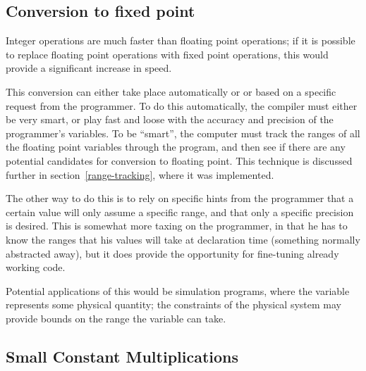 \subsection{Conversion to fixed point}

Integer operations are much faster than floating point operations; if it is
possible to replace floating point operations with fixed point operations,
this would provide a significant increase in speed.

This conversion can either take place automatically or or based on a
specific request from the programmer.  To do this automatically, the
compiler must either be very smart, or play fast and loose with the accuracy
and precision of the programmer's variables.  To be ``smart'', the computer
must track the ranges of all the floating point variables through the
program, and then see if there are any potential candidates for conversion
to floating point.  This technique is discussed further in
section~\ref{range-tracking}, where it was implemented.

The other way to do this is to rely on specific hints from the programmer
that a certain value will only assume a specific range, and that only a
specific precision is desired.  This is somewhat more taxing on the
programmer, in that he has to know the ranges that his values will take at
declaration time (something normally abstracted away), but it does provide
the opportunity for fine-tuning already working code.

Potential applications of this would be simulation programs, where the
variable represents some physical quantity; the constraints of the physical
system may provide bounds on the range the variable can take.
\subsection{Small Constant Multiplications}

